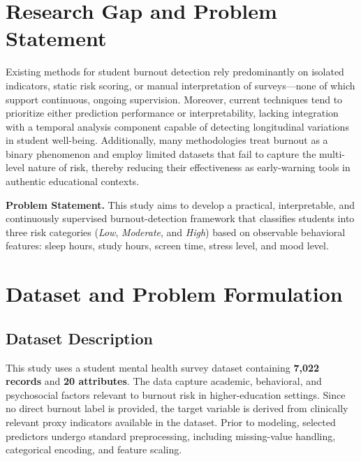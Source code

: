 \documentclass[conference]{IEEEtran}
\begin{document}
\section{Research Gap and Problem Statement}

Existing methods for student burnout detection rely predominantly on isolated indicators, static risk scoring, or manual interpretation of surveys---none of which support continuous, ongoing supervision. Moreover, current techniques tend to prioritize either prediction performance or interpretability, lacking integration with a temporal analysis component capable of detecting longitudinal variations in student well-being. Additionally, many methodologies treat burnout as a binary phenomenon and employ limited datasets that fail to capture the multi-level nature of risk, thereby reducing their effectiveness as early-warning tools in authentic educational contexts.

\textbf{Problem Statement.} This study aims to develop a practical, interpretable, and continuously supervised burnout-detection framework that classifies students into three risk categories (\textit{Low}, \textit{Moderate}, and \textit{High}) based on observable behavioral features: sleep hours, study hours, screen time, stress level, and mood level.

\section{Dataset and Problem Formulation}

\subsection{Dataset Description}

This study uses a student mental health survey dataset containing \textbf{7,022 records} and \textbf{20 attributes}. The data capture academic, behavioral, and psychosocial factors relevant to burnout risk in higher-education settings. Since no direct burnout label is provided, the target variable is derived from clinically relevant proxy indicators available in the dataset. Prior to modeling, selected predictors undergo standard preprocessing, including missing-value handling, categorical encoding, and feature scaling.
\end{document}
